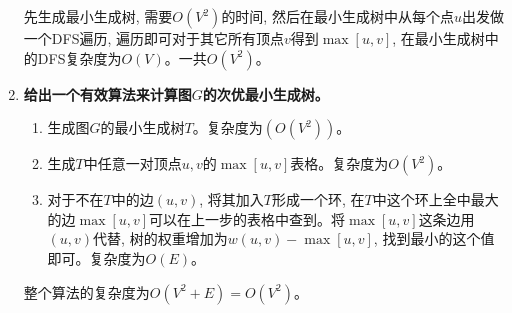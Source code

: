 \documentclass[paper=a4, fontsize=11pt]{scrartcl} %
\numberwithin{equation}{section} %
\numberwithin{figure}{section} %
\numberwithin{table}{section} %
\begin{document}
\begin{enumerate}[a]
  先生成最小生成树, 需要$O(V^2)$的时间, 然后在最小生成树中从每个点$u$出发做一个DFS遍历, 遍历即可对于其它所有顶点$v$得到$\max[u, v]$, 在最小生成树中的DFS复杂度为$O(V)$。一共$O(V^2)$。

\item \textbf{给出一个有效算法来计算图$G$的次优最小生成树。}

  \begin{enumerate}[1]
  \item 生成图$G$的最小生成树$T$。复杂度为$(O(V^2))$。
  \item 生成$T$中任意一对顶点$u, v$的$\max[u, v]$表格。复杂度为$O(V^2)$。
  \item 对于不在$T$中的边$(u, v)$, 将其加入$T$形成一个环, 在$T$中这个环上全中最大的边$\max[u, v]$可以在上一步的表格中查到。将$\max[u, v]$这条边用$(u, v)$代替, 树的权重增加为$w(u, v) - \max[u, v]$, 找到最小的这个值即可。复杂度为$O(E)$。
  \end{enumerate}

  整个算法的复杂度为$O(V^2 + E) = O(V^2)$。
\end{enumerate}
\end{document}
